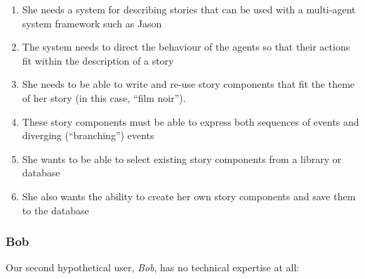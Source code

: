 \documentclass[11pt]{report}
\begin{document}
\begin{enumerate}[{Alice} R1.]
\item She needs a system for describing stories that can be used with a
  multi-agent system framework such as Jason\label{req:alice1}
\item The system needs to direct the behaviour of the agents so that their
  actions fit within the description of a story\label{req:alice2}
\item She needs to be able to write and re-use story components that fit the
  theme of her story (in this case, ``film noir'').\label{req:alice3}
\item These story components must be able to express both sequences of events
  and diverging (``branching'') events\label{req:alice4}
\item She wants to be able to select existing story components from a library or database\label{req:alice5}
\item She also wants the ability to create her own story components and save
  them to the database\label{req:alice6}
\end{enumerate}

\subsubsection{Bob}

Our second hypothetical user, \emph{Bob}, has no technical expertise at all:
\end{document}
